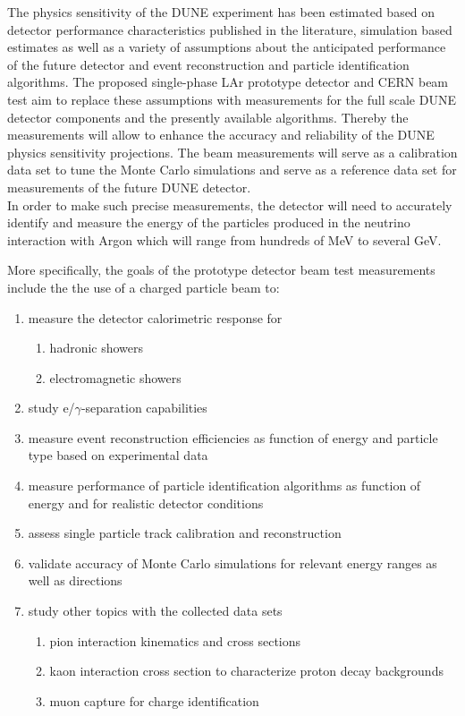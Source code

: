 The physics sensitivity of the DUNE experiment has been estimated based on detector performance characteristics published in the literature, simulation based estimates as well as a variety of assumptions about the anticipated performance of the future detector and event reconstruction and particle identification algorithms.
The proposed single-phase LAr prototype detector and CERN beam test aim to replace these assumptions with measurements for the full scale DUNE detector components and the presently available algorithms. Thereby the measurements will allow to enhance the accuracy and reliability of the DUNE physics sensitivity projections. 
The beam measurements will serve as a calibration data set to tune the Monte Carlo simulations and serve as a reference data set for measurements of the future DUNE detector. \\
%
In order to make such precise measurements, the detector will need to accurately identify and measure the energy of the particles produced in the neutrino interaction with Argon which will range from hundreds of MeV to several GeV.

More specifically, the goals of the prototype detector beam test measurements include the
the use of a charged particle beam to:
\begin{enumerate}
\item measure the detector calorimetric response for
\begin{enumerate}
	\item hadronic showers
	\item electromagnetic showers
\end{enumerate}
\item study e/$\gamma$-separation capabilities
\item measure event reconstruction efficiencies as function of energy and particle type based on experimental data
\item measure performance of particle identification algorithms as function of energy and for realistic detector conditions
\item assess single particle track calibration and reconstruction
\item validate accuracy of Monte Carlo simulations for relevant energy ranges as well as directions

\item study other topics with the collected data sets
 \begin{enumerate}
    \item pion interaction kinematics and cross sections
    \item kaon interaction cross section to characterize proton decay backgrounds 
    \item muon capture for charge identification
 \end{enumerate}
\end{enumerate}

